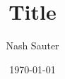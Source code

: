 \documentclass[12pt]{amsart}
\title{Title}
\author{Nash Sauter}
\date{\today}
\begin{document}
\maketitle

\Blindtext{}
	
\end{document}
